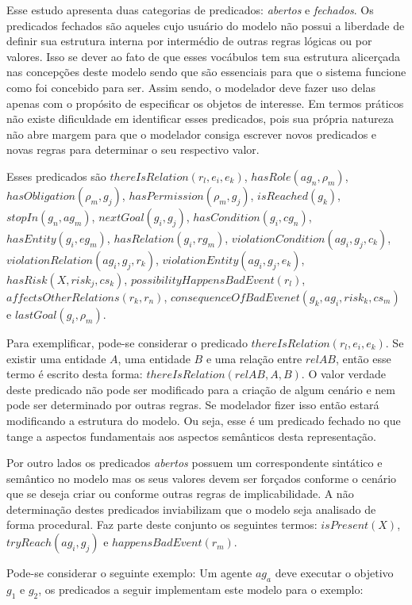 Esse estudo apresenta duas categorias de predicados: \textit{abertos} e \textit{fechados}. Os predicados fechados são aqueles cujo usuário do modelo não possui a liberdade de definir sua estrutura interna por intermédio de outras regras lógicas ou por valores. Isso se dever ao fato de que esses vocábulos tem sua estrutura alicerçada nas concepções deste modelo sendo que são essenciais para que o sistema funcione como foi concebido para ser. Assim sendo, o modelador deve fazer uso delas apenas com o propósito de especificar os objetos de interesse. Em termos práticos não existe dificuldade em identificar esses predicados, pois sua própria natureza não abre margem para que o modelador consiga escrever novos predicados e novas regras para determinar o seu respectivo valor. 

Esses predicados são $thereIsRelation(r_l,e_i,e_k)$, $hasRole(ag_n,\rho_m)$, $hasObligation(\rho_m,g_j)$,
$hasPermission(\rho_m, g_j)$, $isReached(g_k)$, $stopIn(g_n, ag_m)$, $nextGoal(g_i,g_j)$, $hasCondition(g_i,cg_n)$,
$hasEntity(g_i,eg_m)$, $hasRelation(g_i,rg_m)$, $violationCondition(ag_i,g_j,c_k) $, $ violationRelation(ag_i,g_j,r_k) $,
$ violationEntity(ag_i,g_j,e_k) $,  $ hasRisk(X, risk_j, cs_k) $, $possibilityHappensBadEvent(r_l)$, 
$affectsOtherRelations(r_k,r_n)$, $consequenceOfBadEvenet(g_k, ag_i,risk_k,cs_m)$  e $lastGoal(g_i,\rho_m)$. 


Para exemplificar, pode-se considerar o predicado $thereIsRelation(r_l,e_i,e_k)$. Se existir uma entidade $A$, uma entidade $B$ e uma relação entre $relAB$, então esse termo é escrito desta forma: $thereIsRelation(relAB,A,B)$. O valor verdade deste predicado não pode ser modificado para a criação de algum cenário e nem pode ser determinado por outras regras. Se modelador fizer isso então estará modificando a estrutura do modelo. Ou seja, esse é um predicado fechado no que tange a aspectos fundamentais aos aspectos semânticos desta representação. 

Por outro lados os predicados \textit{abertos} possuem um correspondente sintático e semântico no modelo mas os seus valores devem ser forçados conforme o cenário que se deseja criar ou conforme outras regras de implicabilidade. A não determinação destes predicados inviabilizam que o modelo seja analisado de forma procedural. Faz parte deste conjunto os seguintes termos: $isPresent(X)$,$tryReach(ag_i,g_j)$ e $happensBadEvent(r_m)$.

Pode-se considerar o seguinte exemplo: Um agente $ag_a$ deve executar o objetivo $g_1$ e $g_2$, os predicados a seguir implementam este modelo para o exemplo:

